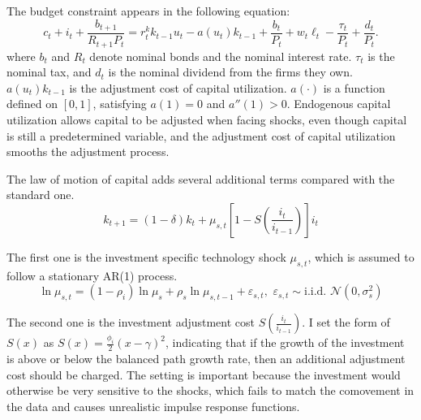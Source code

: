     The budget constraint appears in the following equation:
    \begin{equation}
        c_t + i_t + \frac{b_{t+1}}{R_{t+1}P_t} = r^k_t k_{t-1}u_t - a(u_t)k_{t-1} + \frac{b_t}{P_t} + w_t \ell_t - \frac{\tau_t}{P_t} + \frac{d_t}{P_t}.
    \end{equation}
    where $b_t$ and $R_t$ denote nominal bonds and the nominal interest rate. $\tau_t$ is the nominal tax, and $d_t$ is the nominal dividend from the firms they own. $a(u_t)k_{t-1}$ is the adjustment cost of capital utilization. $a(\cdot)$ is a function defined on $[0, 1]$, satisfying $a(1)=0$ and $a''(1) > 0$. Endogenous capital utilization allows capital to be adjusted when facing shocks, even though capital is still a predetermined variable, and the adjustment cost of capital utilization smooths the adjustment process.

    The law of motion of capital adds several additional terms compared with the standard one.
    \begin{equation}
        k_{t+1} = (1 - \delta) k_t + \mu_{s, t}\left[1 - S\left(\frac{i_t}{i_{t-1}}\right)\right] i_t
    \end{equation}

    The first one is the investment specific technology shock $\mu_{s, t}$, which is assumed to follow a stationary AR(1) process.
    \begin{equation}
        \ln \mu_{s, t} = (1 - \rho_{i}) \ln \mu_{s} + \rho_{s}\ln \mu_{s, t-1} + \varepsilon_{s, t}, \,\, \varepsilon_{s, t} \sim \text{i.i.d. } \mathcal{N}(0, \sigma_s^2)
    \end{equation}
    
    The second one is the investment adjustment cost $S\left(\frac{i_t}{i_{t-1}}\right)$. I set the form of $S(x)$ as $S(x) = \frac{\phi_i}{2}(x - \gamma)^2$, indicating that if the growth of the investment is above or below the balanced path growth rate, then an additional adjustment cost should be charged. The setting is important because the investment would otherwise be very sensitive to the shocks, which fails to match the comovement in the data \citep{winberryLumpyInvestmentBusiness2021} and causes unrealistic impulse response functions.

